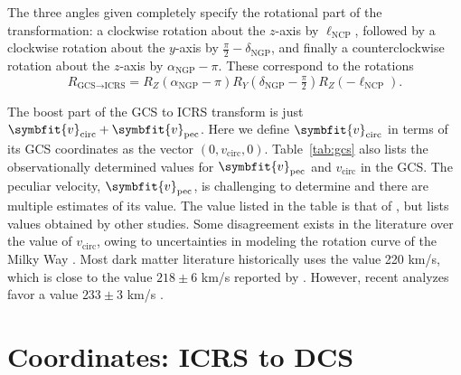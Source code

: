 \documentclass[b5paper, 10pt, twoside]{book}
\renewcommand{\vec}[1]{\symbfit{#1}}
\begin{document}
The three angles given completely specify the rotational part of the transformation: a clockwise rotation about the $z$-axis by $\ell_\text{NCP}$, followed by a clockwise rotation about the $y$-axis by $\tfrac{\pi}{2}-\delta_\text{NGP}$, and finally a counterclockwise rotation about the $z$-axis by $\alpha_\text{NGP}-\pi$. These correspond to the rotations
\begin{equation}
    R_{\text{GCS}\rightarrow\text{ICRS}}=R_Z(\alpha_\text{NGP}-\pi)R_Y(\delta_\text{NGP}-\tfrac{\pi}{2})R_Z(-\ell_\text{NCP}).
\end{equation}

The boost part of the GCS to ICRS transform is just $\vec{v}_\text{circ}+\vec{v}_\text{pec}$. Here we define $\vec{v}_\text{circ}$ in terms of its GCS coordinates as the vector $(0,v_\text{circ},0)$. Table~\ref{tab:gcs} also lists the observationally determined values for $\vec{v}_\text{pec}$ and $v_\text{circ}$ in the GCS. The peculiar velocity, $\vec{v}_\text{pec}$, is challenging to determine and there are multiple estimates of its value. The value listed in the table is that of \textcite{SchonrichBinneyDehnen2010}, but \textcite{Coskunoglu2011} lists values obtained by other studies. Some disagreement exists in the literature over the value of $v_\text{circ}$, owing to uncertainties in modeling the rotation curve of the Milky Way \parencite{McMillanBinney2009}. Most dark matter literature historically uses the value 220 km/s, which is close to the value $218\pm6$ km/s reported by \textcite{Bovy2012}. However, recent analyzes favor a value $233\pm3$ km/s \parencites{McMillan2017, EvansOHareMcCabe2019}.

\section{Coordinates: ICRS to DCS}
\end{document}

